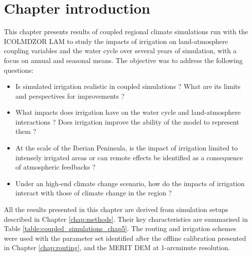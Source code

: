 \section{Chapter introduction}

This chapter presents results of coupled regional climate simulations run with the ICOLMDZOR LAM to study the impacts of irrigation on land-atmosphere coupling variables and the water cycle over several years of simulation, with a focus on annual and seasonal means. 
The objective was to address the following questions:
\begin{itemize}
    \item Is simulated irrigation realistic in coupled simulations ? What are its limits and perspectives for improvements ?
    \item What impacts does irrigation have on the water cycle and land-atmosphere interactions ? Does irrigation improve the ability of the model to represent them ?
    \item At the scale of the Iberian Peninsula, is the impact of irrigation limited to intensely irrigated areas or can remote effects be identified as a consequence of atmospheric feedbacks ?
    \item Under an high-end climate change scenario, how do the impacts of irrigation interact with those of climate change in the region ?
\end{itemize}


All the results presented in this chapter are derived from simulation setups described in Chapter \ref{chap:methods}. Their key characteristics are summarised in Table \ref{table:coupled_simulations_chap5}. The routing and irrigation schemes were used with the parameter set identified after the offline calibration presented in Chapter \ref{chap:routing}, and the MERIT DEM at 1-arcminute resolution.


